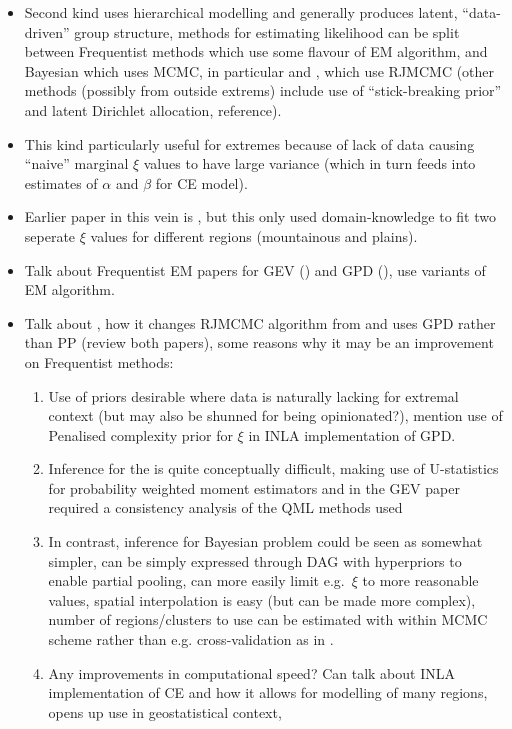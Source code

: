 \documentclass{article}
\numberwithin{equation}{section}
\begin{document}
\begin{itemize}
  \item Second kind uses hierarchical modelling and generally produces latent, ``data-driven'' group structure, methods for estimating likelihood can be split between Frequentist methods which use some flavour of EM algorithm, and Bayesian which uses MCMC, in particular \cite{Bottolo2003} and  \cite{Rohrbeck2021}, which use RJMCMC (other methods (possibly from outside extrems) include use of ``stick-breaking prior'' and latent Dirichlet allocation, reference).
  \item This kind particularly useful for extremes because of lack of data causing ``naive'' marginal $\xi$ values to have large variance (which in turn feeds into estimates of $\alpha$ and $\beta$ for CE model). 
  \item Earlier paper in this vein is \cite{Cooley2007}, but this only used domain-knowledge to fit two seperate $\xi$ values for different regions (mountainous and plains).
  \item Talk about Frequentist EM papers for GEV (\cite{Dupuis2023}) and GPD (\cite{Carreau2017}), use variants of EM algorithm. 
  \item Talk about \cite{Rohrbeck2021}, how it changes RJMCMC algorithm from \cite{Bottolo2003} and uses GPD rather than PP (review both papers), some reasons why it may be an improvement on Frequentist methods:
    \begin{enumerate}
      \item Use of priors desirable where data is naturally lacking for extremal context (but may also be shunned for being opinionated?), mention use of Penalised complexity prior for $\xi$ in INLA implementation of GPD. 
      \item Inference for the \cite{Carreau2017} is quite conceptually difficult, making use of U-statistics for probability weighted moment estimators and in the GEV paper required a  consistency analysis of the QML methods used
      \item In contrast, inference for Bayesian problem could be seen as somewhat simpler, can be simply expressed through DAG with hyperpriors to enable partial pooling, can more easily limit e.g.\ $\xi$ to more reasonable values, spatial interpolation is easy (but can be made more complex), number of regions/clusters to use can be estimated with within MCMC scheme rather than e.g. cross-validation as in \cite{Carreau2017}.
      \item Any improvements in computational speed? Can talk about INLA implementation of CE and how it allows for modelling of many regions, opens up use in geostatistical context,

\end{enumerate}
\end{itemize}
\end{document}
